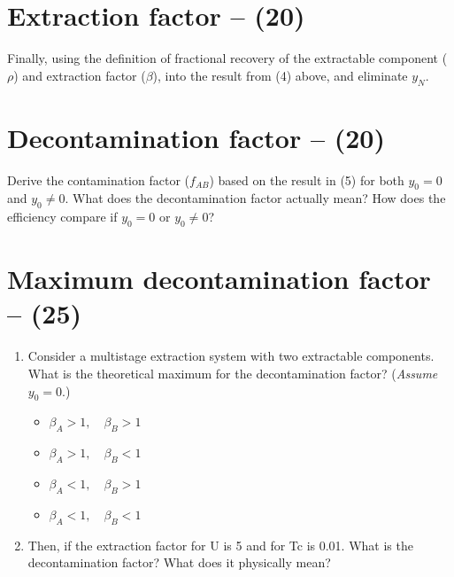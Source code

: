 \documentclass[11pt,a4paper]{article}
\begin{document}
\newpage


\section{Extraction factor -- (20)}
Finally, using the definition of fractional recovery of the extractable component ($\rho$) and extraction factor ($\beta$), into the result from (4) above, and eliminate $y_N$.





\newpage


\section{Decontamination factor -- (20)}
Derive the contamination factor ($f_{AB}$) based on the result in (5) for both $y_0 = 0$ and $y_0 \neq 0$. What does the decontamination factor actually mean? How does the efficiency compare if $y_0 = 0$ or $y_0 \neq 0$?





\newpage


\section{Maximum decontamination factor -- (25)}
\begin{enumerate}
    \item Consider a multistage extraction system with two extractable components. What is the theoretical maximum for the decontamination factor? (\textit{Assume $y_0 = 0$}.)

    \begin{itemize}
        \item$\beta_A > 1, \quad \beta_B > 1$
        \item$\beta_A > 1, \quad \beta_B < 1$
        \item$\beta_A < 1, \quad \beta_B > 1$
        \item$\beta_A < 1, \quad \beta_B < 1$
    \end{itemize}

    \item Then, if the extraction factor for U is 5 and for Tc is 0.01. What is the decontamination factor? What does it physically mean?
\end{enumerate}





\newpage
\end{document}
